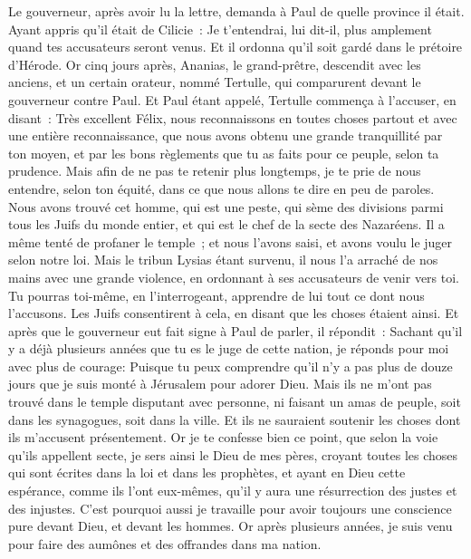 \begin{multicols}{2}
Le gouverneur, après avoir lu la lettre, demanda à Paul de quelle province il était. Ayant appris qu'il était de Cilicie~:
Je t'entendrai, lui dit-il, plus amplement quand tes accusateurs seront venus. Et il ordonna qu'il soit gardé dans le prétoire d'Hérode.
\VerseOne{}Or cinq jours après, Ananias, le grand-prêtre, descendit avec les anciens, et un certain orateur, nommé Tertulle, qui comparurent devant le gouverneur contre Paul. 
Et Paul étant appelé, Tertulle commença à l'accuser, en disant~:
Très excellent Félix, nous reconnaissons en toutes choses partout et avec une entière reconnaissance, que nous avons obtenu une grande tranquillité par ton moyen, et par les bons règlements que tu as faits pour ce peuple, selon ta prudence.
Mais afin de ne pas te retenir plus longtemps, je te prie de nous entendre, selon ton équité, dans ce que nous allons te dire en peu de paroles.
Nous avons trouvé cet homme, qui est une peste, qui sème des divisions parmi tous les Juifs du monde entier, et qui est le chef de la secte des Nazaréens.
Il a même tenté de profaner le temple~; et nous l'avons saisi, et avons voulu le juger selon notre loi.
Mais le tribun Lysias étant survenu, il nous l'a arraché de nos mains avec une grande violence,
en ordonnant à ses accusateurs de venir vers toi. Tu pourras toi-même, en l'interrogeant, apprendre de lui tout ce dont nous l'accusons.
Les Juifs consentirent à cela, en disant que les choses étaient ainsi.
Et après que le gouverneur eut fait signe à Paul de parler, il répondit~: Sachant qu'il y a déjà plusieurs années que tu es le juge de cette nation, je réponds pour moi avec plus de courage:
Puisque tu peux comprendre qu'il n'y a pas plus de douze jours que je suis monté à Jérusalem pour adorer Dieu.
Mais ils ne m'ont pas trouvé dans le temple disputant avec personne, ni faisant un amas de peuple, soit dans les synagogues, soit dans la ville. 
Et ils ne sauraient soutenir les choses dont ils m'accusent présentement.
Or je te confesse bien ce point, que selon la voie qu'ils appellent secte, je sers ainsi le Dieu de mes pères, croyant toutes les choses qui sont écrites dans la loi et dans les prophètes,
et ayant en Dieu cette espérance, comme ils l'ont eux-mêmes, qu'il y aura une résurrection des justes et des injustes.
C'est pourquoi aussi je travaille pour avoir toujours une conscience pure devant Dieu, et devant les hommes.
Or après plusieurs années, je suis venu pour faire des aumônes et des offrandes dans ma nation.

\end{multicols}
